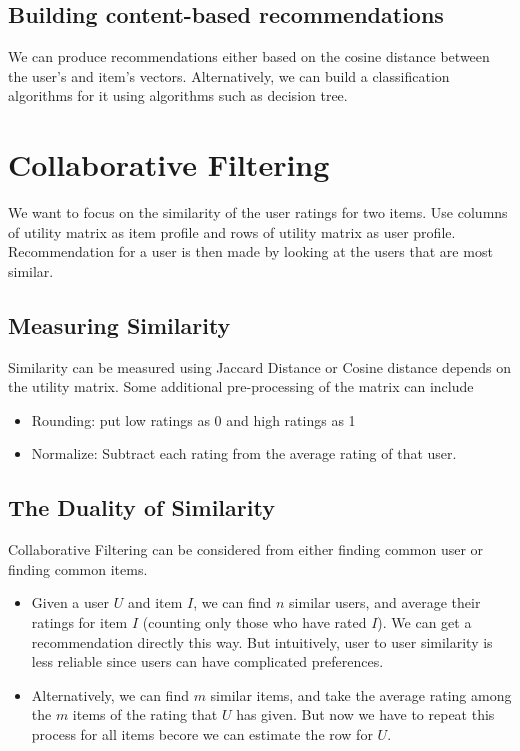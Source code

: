 \subsection{Building content-based recommendations}
We can produce recommendations either based on the cosine distance between the user's and item's vectors. Alternatively, we can build a classification algorithms for it using algorithms such as decision tree. 


\section{Collaborative Filtering}
We want to focus on the similarity of the user ratings for two items. Use columns of utility matrix as item profile and rows of utility matrix as user profile. Recommendation for a user is then made by looking at the users that are most similar. 

\subsection{Measuring Similarity} 
Similarity can be measured using Jaccard Distance or Cosine distance depends on the utility matrix. Some additional pre-processing of the matrix can include 
    \begin{itemize}
        \item Rounding: put low ratings as 0 and high ratings as 1
        \item Normalize: Subtract each rating from the average rating of that user. 
    \end{itemize}

\subsection{The Duality of Similarity} 
Collaborative Filtering can be considered from either finding common user or finding common items. 
    \begin{itemize}
        \item Given a user $U$ and item $I$, we can find $n$ similar users, and average their ratings for item $I$ (counting only those who have rated $I$). We can get a recommendation directly this way. But intuitively, user to user similarity is less reliable since users can have complicated preferences. 
        
        \item Alternatively, we can find $m$ similar items, and take the average rating among the $m$ items of the rating that $U$ has given. But now we have to repeat this process for all items becore we can estimate the row for $U$. 
        
    \end{itemize}
    
